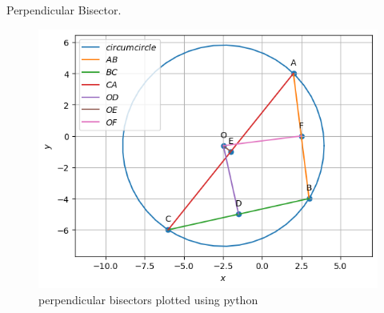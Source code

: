 \begin{table}[H]
        \centering
        
        \caption{Perpendicular Bisector.}
        \label{tab:perp_bisec}
    \end{table}
\begin{figure}[H]
\includegraphics[width=\columnwidth]{pb/figs/perp_bisec.png}
\caption{perpendicular bisectors plotted using python}
\label{fig:i_perp_bisec_py}
\end{figure}

